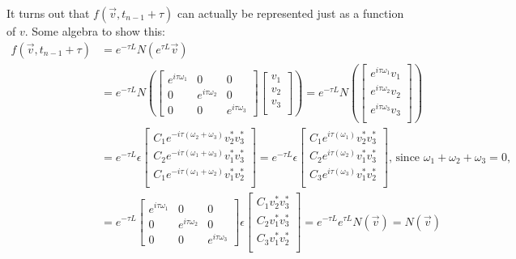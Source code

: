 \documentclass{article}
\theoremstyle{definition}
\begin{document}
It turns out that $f(\vec{v}, t_{n-1}+\tau)$ can actually be represented just as a function of $v$. 
Some algebra to show this:
\begin{align*}
f(\vec{v},t_{n-1}+\tau) &= e^{-\tau L} N(e^{\tau L} \vec{v}) \\
&= e^{-\tau L} N\left(\begin{bmatrix}
e^{i\tau\omega_1} & 0 & 0\\
0 &e^{i\tau\omega_2} & 0 \\
0 & 0 & e^{i\tau\omega_3} 
\end{bmatrix}\begin{bmatrix}
v_1 \\
v_2\\
v_3\\
\end{bmatrix}\right) =e^{-\tau L}  N\left(\begin{bmatrix}
e^{i\tau\omega_1}v_1 \\
e^{i\tau\omega_2}v_2\\
e^{i\tau\omega_3}v_3\\
\end{bmatrix}\right) \\
&= e^{-\tau L} \epsilon \begin{bmatrix}
C_1e^{-i\tau(\omega_2+\omega_3)}v_2^*v_3^* \\
C_2e^{-i\tau(\omega_1+\omega_3)}v_1^*v_3^* \\
C_1e^{-i\tau(\omega_1+\omega_2)}v_1^*v_2^* \\
\end{bmatrix} = e^{-\tau L} \epsilon \begin{bmatrix}
C_1e^{i\tau(\omega_1)}v_2^*v_3^* \\
C_2e^{i\tau(\omega_2)}v_1^*v_3^* \\
C_3e^{i\tau(\omega_3)}v_1^*v_2^* \\
\end{bmatrix} \text{, since }\omega_1+\omega_2+\omega_3 = 0,\\
&= e^{-\tau L} \begin{bmatrix}
e^{i\tau\omega_1} & 0 & 0\\
0 &e^{i\tau\omega_2} & 0 \\
0 & 0 & e^{i\tau\omega_3} 
\end{bmatrix} \epsilon\begin{bmatrix}
C_1v_2^*v_3^* \\
C_2v_1^*v_3^* \\
C_3v_1^*v_2^* \\
\end{bmatrix} = e^{-\tau L} e^{\tau L} N(\vec{v}) = N(\vec{v})
\end{align*}
\end{document}
